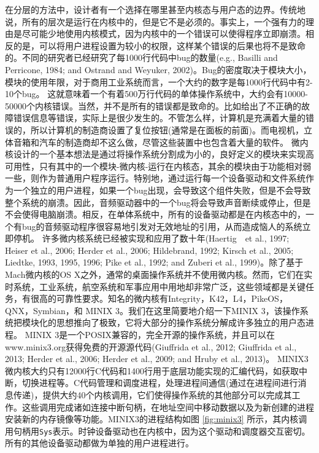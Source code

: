 	在分层的方法中，设计者有一个选择在哪里甚至内核态与用户态的边界。传统地说，所有的层次是运行在内核中的，但是它不是必须的。事实上，一个强有力的理由是尽可能少地使用内核模式，因为内核中的一个错误可以使得程序立即崩溃。相反的是，可以将用户进程设置为较小的权限，这样某个错误的后果也将不是致命的。不同的研究者已经研究了每1000行代码中bug的数量(e.g., Basilli and Perricone, 1984; and Ostrand and Weyuker, 2002)。Bug的密度取决于模块大小，模块的使用年限，对于商用工业系统而言，一个大约的数字是每1000行代码中有2-10个bug。
	这就意味着一个有着500万行代码的单体操作系统中，大约会有10000-50000个内核错误。当然，并不是所有的错误都是致命的。比如给出了不正确的故障错误信息等错误，实际上是很少发生的。不管怎么样，计算机是充满着大量的错误的，所以计算机的制造商设置了复位按钮(通常是在面板的前面)。而电视机，立体音箱和汽车的制造商却不这么做，尽管这些装置中也包含着大量的软件。
	微内核设计的一个基本想法是通过将操作系统分割成为小的，良好定义的模块来实现高可用性，只有其中的一个模块-微内核-运行在内核态，其余的模块由于功能相对弱一些，则作为普通用户程序运行。特别地，通过运行每一个设备驱动和文件系统作为一个独立的用户进程，如果一个bug出现，会导致这个组件失败，但是不会导致整个系统的崩溃。因此，音频驱动器中的一个bug将会导致声音断续或停止，但是不会使得电脑崩溃。相反，在单体系统中，所有的设备驱动都是在内核态中的，一个有bug的音频驱动程序很容易地引发对无效地址的引用，从而造成恼人的系统立即停机。
	许多微内核系统已经被实现和应用了数十年(Haertig　et al., 1997; Heiser et al., 2006; Herder et al., 2006; Hildebrand, 1992; Kirsch et	al., 2005; Liedtke, 1993, 1995, 1996; Pike et al., 1992; and Zuberi et al., 1999)。除了基于Mach微内核的OS X之外，通常的桌面操作系统并不使用微内核。然而，它们在实时系统，工业系统，航空系统和军事应用中用地却非常广泛，这些领域都是关键任务，有很高的可靠性要求。知名的微内核有Integrity，K42，L4，PikeOS，QNX，Symbian，和
	MINIX 3。我们在这里简要地介绍一下MINIX 3，该操作系统把模块化的思想推向了极致，它将大部分的操作系统分解成许多独立的用户态进程。
	MINIX 3是一个POSIX兼容的，完全开源的操作系统，并且可以在www.minix3.org获得免费的开源源代码(Giuffrida et al., 2012; Giuffrida et al., 2013; Herder et al., 2006; Herder et al., 2009; and Hruby et al., 2013)。
	MINIX3微内核大约只有12000行C代码和1400行用于底层功能实现的汇编代码，如获取中断，切换进程等。C代码管理和调度进程，处理进程间通信(通过在进程间进行消息传递)，提供大约40个内核调用，它们使得操作系统的其他部分可以完成其工作。这些调用完成诸如连接中断句柄，在地址空间中移动数据以及为新创建的进程安装新的内存镜像等功能。MINIX3的进程结构如图 \ref{fig:minix3} 所示，其内核调用句柄用\texttt{Sys}表示。时钟设备驱动也在内核中，因为这个驱动和调度器交互密切。所有的其他设备驱动都做为单独的用户进程进行。
	
